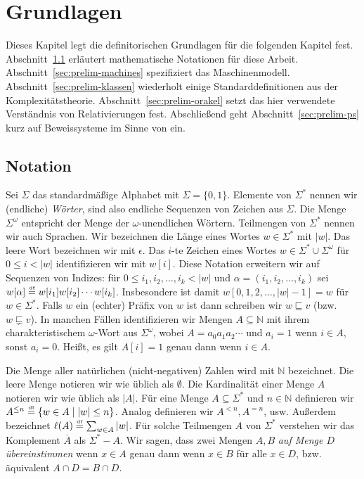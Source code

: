 \chapter{Grundlagen}\label{chap:prelim}

Dieses Kapitel legt die definitorischen Grundlagen für die folgenden Kapitel fest. Abschnitt~\ref{sec:notation} erläutert mathematische Notationen für diese Arbeit. Abschnitt~\ref{sec:prelim-machines} spezifiziert das Maschinenmodell.  Abschnitt~\ref{sec:prelim-klassen} wiederholt einige Standarddefinitionen aus der Komplexitätstheorie. Abschnitt~\ref{sec:prelim-orakel} setzt das hier verwendete Verständnis von Relativierungen fest. Abschließend geht Abschnitt~\ref{sec:prelim-ps} kurz auf Beweissysteme im Sinne von \textcite{cook_relative_1979} ein.

\section{Notation}\label{sec:notation}

Sei $\Sigma$ das standardmäßige Alphabet mit $\Sigma=\{0,1\}$. Elemente von $\Sigma^*$ nennen wir (endliche) \emph{Wörter}, sind also endliche Sequenzen von Zeichen aus $\Sigma$. Die Menge $\Sigma^\omega$ entspricht der Menge der $\omega$-unendlichen Wörtern. Teilmengen von $\Sigma^*$ nennen wir auch Sprachen. Wir bezeichnen die Länge eines Wortes $w\in\Sigma^*$ mit $|w|$. Das leere Wort bezeichnen wir mit $\epsilon$. Das $i$-te Zeichen eines Wortes $w\in\Sigma^*\cup\Sigma^\omega$ für $0\leq i< |w|$ identifizieren wir mit $w[i]$. Diese Notation erweitern wir auf Sequenzen von Indizes: für $0\leq i_1, i_2, \dots, i_k< |w|$ und $\alpha=(i_1, i_2, \dots, i_k)$ sei $w[\alpha] \stackrel{\text{\smash{\tiny df}}}{=} w[i_1]w[i_2]\cdots w[i_k]$. Insbesondere ist damit $w[0,1,2,\dots, |w|-1]= w$ für $w\in\Sigma^*$.
Falls $w$ ein (echter) Präfix von $w$ ist dann schreiben wir $w \sqsubseteq v$ (bzw. $w\sqsubsetneq v$).
In manchen Fällen identifizieren wir Mengen $A\subseteq\mathbb N$ mit ihrem charakteristischem $\omega$-Wort aus $\Sigma^\omega$, wobei $A=a_0a_1a_2\cdots$ und $a_i=1$ wenn $i\in A$, sonst $a_i=0$.
Heißt, es gilt $A[i] = 1$ genau dann wenn $i\in A$.

Die Menge aller natürlichen (nicht-negativen) Zahlen wird mit $\mathbb N$ bezeichnet. Die leere Menge notieren wir wie üblich als $\emptyset$. Die Kardinalität einer Menge $A$ notieren wir wie üblich als $|A|$. Für eine Menge $A\subseteq\Sigma^*$ und $n\in \mathbb N$ definieren wir $A^{\leq n} \stackrel{\text{\smash{\tiny df}}}{=} \{ w\in A \mid |w|\leq n\}$. Analog definieren wir $A^{<n}, A^{=n}$, usw. Außerdem bezeichnet $\ell(A)\stackrel{\text{\smash{\tiny df}}}{=}\sum_{w\in A} |w|$. Für solche Teilmengen $A$ von $\Sigma^*$ verstehen wir das Komplement $\overline{A}$ als $\Sigma^*-A$.
Wir sagen, dass zwei Mengen $A, B$ \emph{auf Menge $D$ übereinstimmen} wenn $x\in A$ genau dann wenn $x\in B$ für alle $x\in D$, bzw. äquivalent $A\cap D= B\cap D$.

